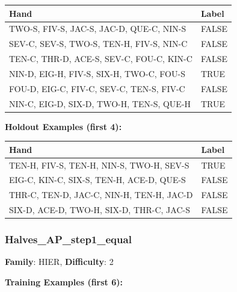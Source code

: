 \documentclass[10pt,a4paper]{article}
\begin{document}
\begin{small}
\begin{tabular}{p{8cm}l}
\toprule
Hand & Label \\
\midrule
TWO-S, FIV-S, JAC-S, JAC-D, QUE-C, NIN-S & \textcolor{negative}{FALSE} \\
SEV-C, SEV-S, TWO-S, TEN-H, FIV-S, NIN-C & \textcolor{negative}{FALSE} \\
TEN-C, THR-D, ACE-S, SEV-C, FOU-C, KIN-C & \textcolor{negative}{FALSE} \\
NIN-D, EIG-H, FIV-S, SIX-H, TWO-C, FOU-S & \textcolor{positive}{TRUE} \\
FOU-D, EIG-C, FIV-C, SEV-C, TEN-S, FIV-C & \textcolor{negative}{FALSE} \\
NIN-C, EIG-D, SIX-D, TWO-H, TEN-S, QUE-H & \textcolor{positive}{TRUE} \\
\bottomrule
\end{tabular}
\end{small}

\textbf{Holdout Examples (first 4):}

\begin{small}
\begin{tabular}{p{8cm}l}
\toprule
Hand & Label \\
\midrule
TEN-H, FIV-S, TEN-H, NIN-S, TWO-H, SEV-S & \textcolor{positive}{TRUE} \\
EIG-C, KIN-C, SIX-S, TEN-H, ACE-D, QUE-S & \textcolor{negative}{FALSE} \\
THR-C, TEN-D, JAC-C, NIN-H, TEN-H, JAC-D & \textcolor{negative}{FALSE} \\
SIX-D, ACE-D, TWO-H, SIX-D, THR-C, JAC-S & \textcolor{negative}{FALSE} \\
\bottomrule
\end{tabular}
\end{small}

\vspace{0.5cm}

\subsubsection{Halves\_AP\_step1\_equal}

\textbf{Family}: HIER, \textbf{Difficulty}: 2

\textbf{Training Examples (first 6):}
\end{document}
